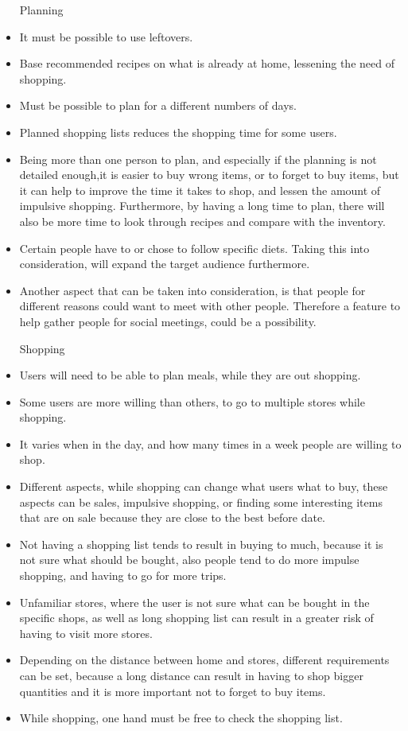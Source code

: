 \begin{itemize}
  \item[Planning]
    \item It must be possible to use leftovers.
    \item Base recommended recipes on what is already at home, lessening the need of shopping.
    \item Must be possible to plan for a different numbers of days.
    \item Planned shopping lists reduces the shopping time for some users.
    \item Being more than one person to plan, and especially if the planning is not detailed enough,it is easier to buy wrong items, or to forget to buy items, but it can help to improve the time it takes to shop, and lessen the amount of impulsive shopping. Furthermore, by having a long time to plan, there will also be more time to look through recipes and compare with the inventory.
    \item Certain people have to or chose to follow specific diets. Taking this into consideration, will expand the target audience furthermore.
    \item Another aspect that can be taken into consideration, is that people for different reasons could want to meet with other people. Therefore a feature to help gather people for social meetings, could be a possibility.
  
  \item[Shopping]
    \item Users will need to be able to plan meals, while they are out shopping.  
    \item Some users are more willing than others, to go to multiple stores while shopping.
    \item It varies when in the day, and how many times in a week people are willing to shop.
    \item Different aspects, while shopping can change what users what to buy, these aspects can be sales, impulsive shopping, or finding some interesting items that are on sale because they are close to the best before date.
    \item Not having a shopping list tends to result in buying to much, because it is not sure what should be bought, also people tend to do more impulse shopping, and having to go for more trips.
    \item Unfamiliar stores, where the user is not sure what can be bought in the specific shops, as well as long shopping list can result in a greater risk of having to visit more stores.
    \item Depending on the distance between home and stores, different requirements can be set, because a long distance can result in having to shop bigger quantities and it is more important not to forget to buy items.
    \item While shopping, one hand must be free to check the shopping list.
    

\end{itemize}
